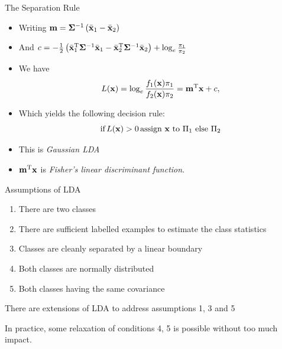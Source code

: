 \documentclass[aspectratio=169]{beamer}
\begin{document}
\begin{frame}{The Separation Rule}
  \begin{itemize}
    \item Writing $\mathbf{m}=\mathbf{\Sigma}^{-1} \left(\bar{\mathbf{x}}_1-\bar{\mathbf{x}}_2\right)$
    \item And $c = -\frac{1}{2}\left(\bar{\mathbf{x}}_1^{\mathrm{T}}\mathbf{\Sigma}^{-1}\bar{\mathbf{x}}_1 - \bar{\mathbf{x}}_2^{\mathrm{T}}\mathbf{\Sigma}^{-1}\bar{\mathbf{x}}_2\right)+\log_e\frac{\pi_1}{\pi_2}$
    \item We have
      \begin{equation*}
        L(\mathbf{x}) = \log_e\frac{f_1(\mathbf{x})\pi_1}{f_2(\mathbf{x})\pi_2} = \mathbf{m}^{\mathrm{T}}\mathbf{x}+c,\label{eq:lindisc}
      \end{equation*}
    \item Which yields the following decision rule:
      \begin{equation*}
        \mbox{if}\,L(\mathbf{x})>0\,\mbox{assign $\mathbf{x}$ to $\Pi_1$ else $\Pi_2$}
      \end{equation*}
    \item This is \textit{Gaussian LDA}
    \item $\mathbf{m}^{\mathrm{T}}\mathbf{x}$ is \textit{Fisher's linear discriminant function}.
  \end{itemize}
\end{frame}

\begin{frame}{Assumptions of LDA}
  \begin{enumerate}
    \item There are two classes
    \item There are sufficient labelled examples to estimate the class statistics
    \item Classes are cleanly separated by a linear boundary
    \item Both classes are normally distributed 
    \item Both classes having the same covariance
  \end{enumerate}
  \pause
  There are extensions of LDA to address assumptions 1, 3 and 5

  In practice, some relaxation of conditions 4, 5 is possible without too much impact.
\end{frame}
\end{document}
